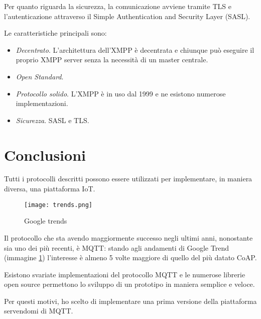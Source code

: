 Per quanto riguarda la sicurezza, la comunicazione avviene tramite TLS e l'autenticazione attraverso il Simple Authentication and Security Layer (SASL).

Le caratteristiche principali sono:
\begin{itemize}
    \item \emph{Decentrato}. L'architettura dell'XMPP è decentrata e chiunque può eseguire il proprio XMPP server senza la necessità di un master centrale.
    \item \emph{Open Standard}.
    \item \emph{Protocollo solido}. L'XMPP è in uso dal 1999 e ne esistono numerose implementazioni.
    \item \emph{Sicurezza}. SASL e TLS.
\end{itemize}

\section{Conclusioni}
Tutti i protocolli descritti possono essere utilizzati per implementare, in maniera diversa, una piattaforma IoT.
\begin{figure}
\begin{center}
 \texttt{[image: trends.png]}%
 \caption{Google trends}
 \label{fig:trends}
\end{center}
\end{figure}
Il protocollo che sta avendo maggiormente successo negli ultimi anni, nonostante sia uno dei più recenti, è MQTT: stando agli andamenti di Google Trend (immagine \ref{fig:trends}) l'interesse è almeno 5 volte maggiore di quello del più datato CoAP.

Esistono svariate implementazioni del protocollo MQTT e le numerose librerie open source permettono lo sviluppo di un prototipo in maniera semplice e veloce.

Per questi motivi, ho scelto di implementare una prima versione della piattaforma servendomi di MQTT.
